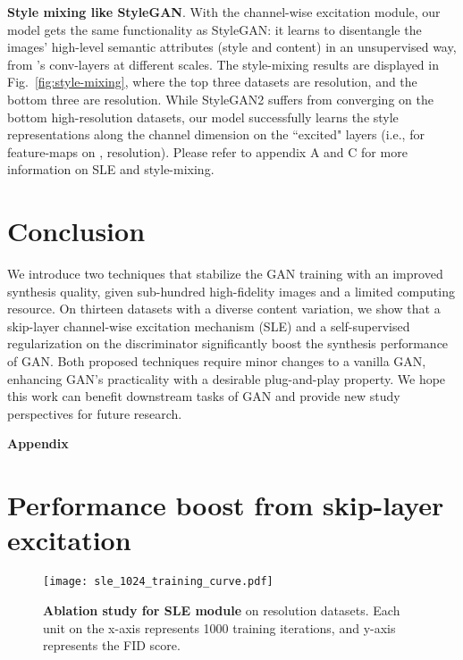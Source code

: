 \documentclass{article} \usepackage{iclr2021_conference,times}
\begin{document}
\textbf{Style mixing like StyleGAN}. With the channel-wise excitation module, our model gets the same functionality as StyleGAN: it learns to disentangle the images' high-level semantic attributes (style and content) in an unsupervised way, from 's conv-layers at different scales. The style-mixing results are displayed in Fig.~\ref{fig:style-mixing}, where the top three datasets are  resolution, and the bottom three are  resolution. While StyleGAN2 suffers from converging on the bottom high-resolution datasets, our model successfully learns the style representations along the channel dimension on the ``excited" layers (i.e., for feature-maps on ,  resolution). Please refer to appendix A and C for more information on SLE and style-mixing.




\section{Conclusion}
We introduce two techniques that stabilize the GAN training with an improved synthesis quality, given sub-hundred high-fidelity images and a limited computing resource. On thirteen datasets with a diverse content variation, we show that a skip-layer channel-wise excitation mechanism (SLE) and a self-supervised regularization on the discriminator significantly boost the synthesis performance of GAN. Both proposed techniques require minor changes to a vanilla GAN, enhancing GAN's practicality with a desirable plug-and-play property. We hope this work can benefit downstream tasks of GAN \citep{liu2020oogan,Liu_2020_ACCV,elgammal2017can} and provide new study perspectives for future research.







\clearpage

\appendix

\noindent\textbf{Appendix}


\section{Performance boost from skip-layer excitation}

\begin{figure}[h]
\centering
\texttt{[image: sle\_1024\_training\_curve.pdf]}
\caption{\textbf{Ablation study for SLE module} on  resolution datasets. Each unit on the x-axis represents 1000 training iterations, and y-axis represents the FID score. }
\label{fig:sle-curve}
\end{figure}
\end{document}
